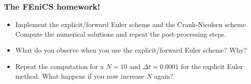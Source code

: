 \begin{frame}
    \frametitle{The FEniCS homework!}
    \begin{itemize}
        \item Implement the explicit/forward Euler scheme 
            and the Crank-Nicolsen scheme. Compute the numerical
            solutions and repeat the post-processing steps.
        \item What do you observe when you use the explicit/forward Euler scheme?
            Why?
        \item Repeat the computation for a $N= 10$ and $\Delta t =
            0.0001$ for the explicit Euler method.
            What happens if you now increase $N$ again?
    \end{itemize}
\end{frame}
